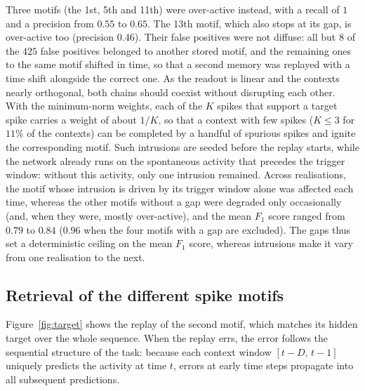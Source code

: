 \documentclass{scrartcl}
\begin{document}
Three motifs (the 1st, 5th and 11th) were over-active instead, with a recall of $1$ and a precision from $0.55$ to $0.65$. The 13th motif, which also stops at its gap, is over-active too (precision $0.46$). Their false positives were not diffuse: all but $8$ of the $425$ false positives belonged to another stored motif, and the remaining ones to the same motif shifted in time, so that a second memory was replayed with a time shift alongside the correct one. As the readout is linear and the contexts nearly orthogonal, both chains should coexist without disrupting each other. With the minimum-norm weights, each of the $K$ spikes that support a target spike carries a weight of about $1/K$, so that a context with few spikes ($K \le 3$ for $11\%$ of the contexts) can be completed by a handful of spurious spikes and ignite the corresponding motif. Such intrusions are seeded before the replay starts, while the network already runs on the spontaneous activity that precedes the trigger window: without this activity, only one intrusion remained. Across realisations, the motif whose intrusion is driven by its trigger window alone was affected each time, whereas the other motifs without a gap were degraded only occasionally (and, when they were, mostly over-active), and the mean $F_1$ score ranged from $0.79$ to $0.84$ ($0.96$ when the four motifs with a gap are excluded). The gaps thus set a deterministic ceiling on the mean $F_1$ score, whereas intrusions make it vary from one realisation to the next.

\subsection{Retrieval of the different spike motifs}


Figure~\ref{fig:target} shows the replay of the second motif, which matches its hidden target over the whole sequence. When the replay errs, the error follows the sequential structure of the task: because each context window $[t-D,\, t-1]$ uniquely predicts the activity at time $t$, errors at early time steps propagate into all subsequent predictions.
\end{document}

